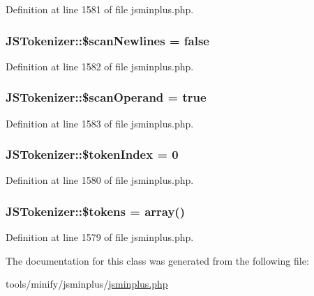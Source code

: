 Definition at line 1581 of file jsminplus.\+php.

\hypertarget{classJSTokenizer_a7238765a570fcc1157197b4d4c6480ef}{
\subsubsection[{\$scan\+Newlines}]{\setlength{\rightskip}{0pt plus 5cm}J\+S\+Tokenizer\+::\$scan\+Newlines = false}}\label{classJSTokenizer_a7238765a570fcc1157197b4d4c6480ef}


Definition at line 1582 of file jsminplus.\+php.

\hypertarget{classJSTokenizer_a362e5776af8204bcccad1f1fc248faa1}{
\subsubsection[{\$scan\+Operand}]{\setlength{\rightskip}{0pt plus 5cm}J\+S\+Tokenizer\+::\$scan\+Operand = true}}\label{classJSTokenizer_a362e5776af8204bcccad1f1fc248faa1}


Definition at line 1583 of file jsminplus.\+php.

\hypertarget{classJSTokenizer_aeed62894fc90ca68f24103ffed2a997d}{
\subsubsection[{\$token\+Index}]{\setlength{\rightskip}{0pt plus 5cm}J\+S\+Tokenizer\+::\$token\+Index = 0}}\label{classJSTokenizer_aeed62894fc90ca68f24103ffed2a997d}


Definition at line 1580 of file jsminplus.\+php.

\hypertarget{classJSTokenizer_aef56a1e74b038b2da58032fd34c98370}{
\subsubsection[{\$tokens}]{\setlength{\rightskip}{0pt plus 5cm}J\+S\+Tokenizer\+::\$tokens = array()}}\label{classJSTokenizer_aef56a1e74b038b2da58032fd34c98370}


Definition at line 1579 of file jsminplus.\+php.



The documentation for this class was generated from the following file\+:\begin{DoxyCompactItemize}
\item 
tools/minify/jsminplus/\hyperlink{jsminplus_8php}{jsminplus.\+php}\end{DoxyCompactItemize}
